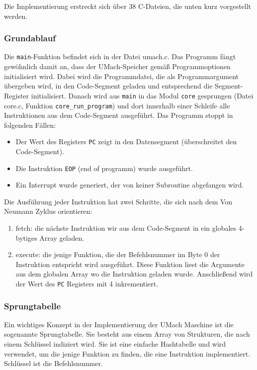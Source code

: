 Die Implementierung erstreckt sich über 38 C-Dateien, die unten kurz vorgestellt
werden.

\subsubsection{Grundablauf}
Die \texttt{main}-Funktion befindet sich in der Datei umach.c. Das Programm
fängt gewöhnlich damit an, dass der UMach-Speicher gemäß Programmoptionen
initialisiert wird. Dabei wird die Programmdatei, die als Programmargument
übergeben wird, in den Code-Segment geladen und entsprechend die
Segment-Register initialisiert. Danach wird aus \texttt{main} in das Modul
\texttt{core} gesprungen (Datei core.c, Funktion \texttt{core\_run\_program})
und dort innerhalb einer Schleife alle Instruktionen aus dem Code-Segment
ausgeführt. Das Programm stoppt in folgenden Fällen:
\begin{itemize}
  \item Der Wert des Registers \texttt{PC} zeigt in den Datensegment
(überschreitet den Code-Segment).
  \item Die Instruktion \texttt{EOP} (end of programm) wurde ausgeführt.
  \item Ein Interrupt wurde generiert, der von keiner Subroutine abgefangen
wird.
\end{itemize}


Die Ausführung jeder Instruktion hat zwei Schritte, die sich nach dem Von
Neumann Zyklus orientieren:
\begin{enumerate}
  \item fetch: die nächste Instruktion wir aus dem Code-Segment in ein globales
4-bytiges Array geladen. 
  \item execute: die jenige Funktion, die der Befehlsnummer im Byte 0 der
Instruktion entspricht wird ausgeführt. Diese Funktion liest die Argumente aus
dem globalen Array wo die Instruktion geladen wurde. Anschließend wird der Wert
des \texttt{PC} Registers mit 4 inkrementiert.
\end{enumerate}


\subsubsection{Sprungtabelle}

Ein wichtiges Konzept in der Implementierung der UMach Maschine ist die
sogenannte Sprungtabelle. Sie besteht aus einem Array von Strukturen, die nach
einem Schlüssel indiziert wird. Sie ist eine einfache Hashtabelle und wird
verwendet, um die jenige Funktion zu finden, die eine Instruktion
implementiert. Schlüssel ist die Befehlsnummer.













